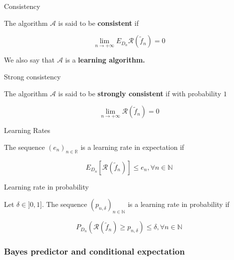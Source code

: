 \documentclass[
10pt, %
a4paper, %
oneside, %
headinclude,footinclude, %
BCOR5mm, %
]{scrartcl}
\begin{document}
\begin{definition}{Consistency}

    The algorithm $\mathcal{A} $ is said to be \textbf{{consistent}}  if 

    \begin{equation*}
	\lim_{n\rightarrow +\infty} E_{D_n} \mathcal{R} ( \tilde{f}_n)=0 
    \end{equation*}
\end{definition}

    We also say that $ \mathcal{A} $ is a \textbf{{learning algorithm.}} 

\begin{definition}{Strong consistency}

    The algorithm $\mathcal{A} $ is said to be \textbf{{strongly consistent}}  if with probability $1$

    \begin{equation*}
	\lim_{n\rightarrow +\infty} \mathcal{R} ( \tilde{f}_n)=0 
    \end{equation*}


\end{definition}

\begin{definition}{Learning Rates}

    The sequence $(e_n)_{n \in \mathbb{R} } $ is a learning rate in expectation if

    \begin{equation*}
	E_{D_n} [\mathcal{R} ( \tilde{f}_n)]\leq e_n, \forall n\in \mathbb{N} 
    \end{equation*}
    
\end{definition}

\begin{definition}{Learning rate in probability}

    Let $\delta \in ]0, 1]$.  The  sequence $(p_{n, \delta})_{n\in \mathbb{N} }$ is a learning rate in probability if

    \begin{equation*}
	P_{D_n}( \mathcal{R} ( \tilde{f}_n)\geq p_{n,\delta})\leq \delta, \forall n\in \mathbb{N} 
    \end{equation*}
\end{definition}


    \subsubsection{\large\color{Periwinkle}Bayes predictor and conditional expectation}
\end{document}
